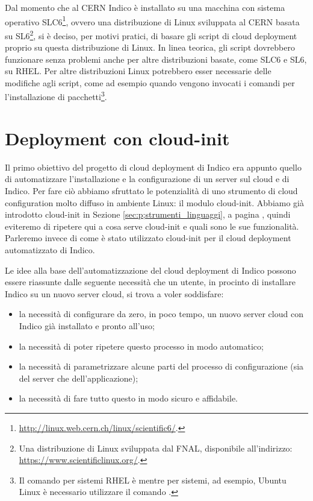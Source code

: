     Dal momento che al \ac{CERN} Indico è installato su una macchina con sistema operativo \ac{SLC6}\footnote{\url{http://linux.web.cern.ch/linux/scientific6/}.}, ovvero una distribuzione di Linux sviluppata al \ac{CERN} basata su \ac{SL6}\footnote{Una distribuzione di Linux sviluppata dal \ac{FNAL}, disponibile all'indirizzo: \url{https://www.scientificlinux.org/}.}, si è deciso, per motivi pratici, di basare gli script di cloud deployment proprio su questa distribuzione di Linux. In linea teorica, gli script dovrebbero funzionare senza problemi anche per altre distribuzioni basate, come \ac{SLC6} e \ac{SL6}, su \ac{RHEL}. Per altre distribuzioni Linux potrebbero esser necessarie delle modifiche agli script, come ad esempio quando vengono invocati i comandi per l'installazione di pacchetti\footnote{Il comando per sistemi \ac{RHEL} è  mentre per sistemi, ad esempio, Ubuntu Linux è necessario utilizzare il comando .}.

    \section{Deployment con cloud-init} \label{sec:cd;deployment_cloud-init}
    
        Il primo obiettivo del progetto di cloud deployment di Indico era appunto quello di automatizzare l'installazione e la configurazione di un server sul cloud e di Indico. Per fare ciò abbiamo sfruttato le potenzialità di uno strumento di cloud configuration molto diffuso in ambiente Linux: il modulo cloud-init.
        Abbiamo già introdotto cloud-init in Sezione \ref{sec:p;strumenti_linguaggi}, a pagina \pageref{subsec:p;sl;cloud-init}, quindi eviteremo di ripetere qui a cosa serve cloud-init e quali sono le sue funzionalità. Parleremo invece di come è stato utilizzato cloud-init per il cloud deployment automatizzato di Indico.
        
        Le idee alla base dell'automatizzazione del cloud deployment di Indico possono essere riassunte dalle seguente necessità che un utente, in procinto di installare Indico su un nuovo server cloud, si trova a voler soddisfare:
        
        \begin{itemize}
            \item la necessità di configurare da zero, in poco tempo, un nuovo server cloud con Indico già installato e pronto all'uso;
            \item la necessità di poter ripetere questo processo in modo automatico;
            \item la necessità di parametrizzare alcune parti del processo di configurazione (sia del server che dell'applicazione);
            \item la necessità di fare tutto questo in modo sicuro e affidabile.
        \end{itemize}
        
